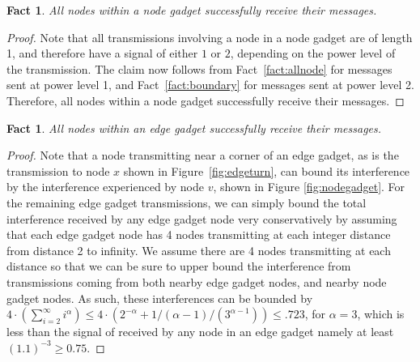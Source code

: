 \documentclass{article}
\newtheorem{fact}[lemma]{Fact}
\begin{document}
\begin{fact}
All nodes within a node gadget successfully receive their messages.
\end{fact}
\begin{proof}
Note that all transmissions involving a node in a node gadget are of length 1, and therefore have a signal of either $1$ or $2$, depending on the power level of the transmission.
The claim now follows from Fact~\ref{fact:allnode} for messages sent at power level 1, and Fact~\ref{fact:boundary} for messages sent at power level 2. Therefore, all nodes within a node gadget successfully receive their messages.
\end{proof}

\begin{fact}
All nodes within an edge gadget successfully receive their messages.
\end{fact}
\begin{proof}
Note that a node transmitting near a corner of an edge gadget, as is the transmission to node $x$ shown in Figure~\ref{fig:edgeturn}, can bound its interference by the interference experienced by node $v$, shown in Figure \ref{fig:nodegadget}.  For the remaining edge gadget transmissions, we can simply bound the total interference received by any edge gadget node very conservatively by assuming that each edge gadget node has 4 nodes transmitting at each integer distance from distance 2 to infinity.  We assume there are 4 nodes transmitting at each distance so that we can be sure to upper bound the interference from transmissions coming from both nearby edge gadget nodes, and nearby node gadget nodes.  As such, these interferences can be bounded by $4 \cdot (\sum_{i=2}^{\infty} i^\alpha) \leq 4 \cdot (2^{-\alpha} + 1/(\alpha-1)/(3^{\alpha-1})) \leq .723$, for $\alpha=3$, which is less than the signal of received by any node in an edge gadget namely at least $(1.1)^{-3} \geq 0.75$.
\end{proof}
\end{document}
